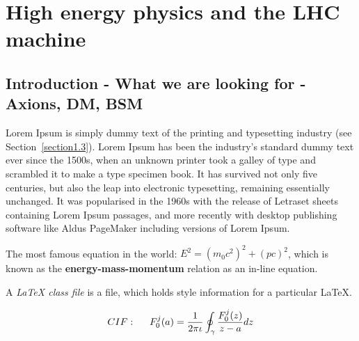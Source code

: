 
\chapter{High energy physics and the LHC machine}  %

\ifpdf
    \graphicspath{{Introduction/Figs/Raster/}{Introduction/Figs/PDF/}{Introduction/Figs/}}
\else
    \graphicspath{{Introduction/Figs/Vector/}{Introduction/Figs/}}
\fi


\section{Introduction - What we are looking for - Axions, DM, BSM} %

Lorem Ipsum is simply dummy text of the printing and typesetting industry (see 
Section~\ref{section1.3}). Lorem Ipsum has been the industry's 
standard dummy text ever since the 1500s, when an unknown printer took a galley 
of type and scrambled it to make a type specimen book. It has survived not only 
five centuries, but also the leap into electronic typesetting, remaining 
essentially unchanged. It was popularised in the 1960s with the release of 
Letraset sheets containing Lorem Ipsum passages, and more recently with desktop 
publishing software like Aldus PageMaker including versions of Lorem 
Ipsum.

The most famous equation in the world: $E^2 = (m_0c^2)^2 + (pc)^2$, which is 
known as the \textbf{energy-mass-momentum} relation as an in-line equation.

A {\em \LaTeX{} class file} is a file, which holds style information for a particular \LaTeX{}.


\begin{align}
CIF: \hspace*{5mm}F_0^j(a) = \frac{1}{2\pi \iota} \oint_{\gamma} \frac{F_0^j(z)}{z - a} dz
\end{align}


